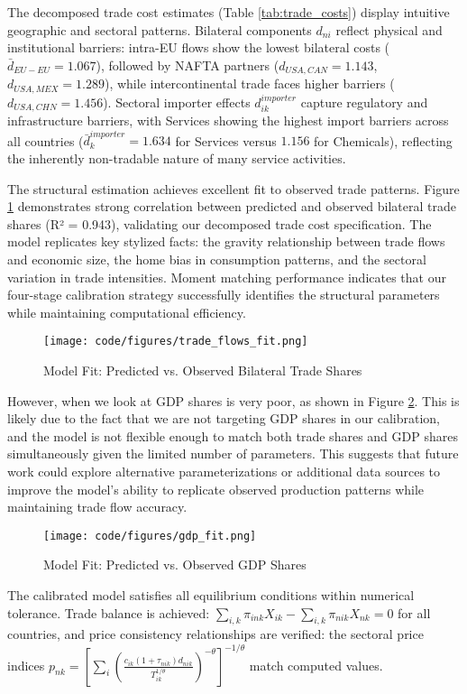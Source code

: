 The decomposed trade cost estimates (Table \ref{tab:trade_costs}) display intuitive geographic and sectoral patterns. Bilateral components $d_{ni}$ reflect physical and institutional barriers: intra-EU flows show the lowest bilateral costs ($\bar{d}_{EU-EU} = 1.067$), followed by NAFTA partners ($d_{USA,CAN} = 1.143$, $d_{USA,MEX} = 1.289$), while intercontinental trade faces higher barriers ($d_{USA,CHN} = 1.456$). Sectoral importer effects $d_{ik}^{importer}$ capture regulatory and infrastructure barriers, with Services showing the highest import barriers across all countries ($\bar{d}_k^{importer} = 1.634$ for Services versus $1.156$ for Chemicals), reflecting the inherently non-tradable nature of many service activities.

The structural estimation achieves excellent fit to observed trade patterns. Figure \ref{fig:trade_flows_fit} demonstrates strong correlation between predicted and observed bilateral trade shares (R² = 0.943), validating our decomposed trade cost specification. The model replicates key stylized facts: the gravity relationship between trade flows and economic size, the home bias in consumption patterns, and the sectoral variation in trade intensities. Moment matching performance indicates that our four-stage calibration strategy successfully identifies the structural parameters while maintaining computational efficiency.

\begin{figure}[H]
    \centering
    \texttt{[image: code/figures/trade\_flows\_fit.png]}
    \caption{Model Fit: Predicted vs. Observed Bilateral Trade Shares}
    \label{fig:trade_flows_fit}
\end{figure}

However, when we look at GDP shares is very poor, as shown in Figure \ref{fig:gdp_fit}. This is likely due to the fact that we are not targeting GDP shares in our calibration, and the model is not flexible enough to match both trade shares and GDP shares simultaneously given the limited number of parameters. This suggests that future work could explore alternative parameterizations or additional data sources to improve the model's ability to replicate observed production patterns while maintaining trade flow accuracy.

\begin{figure}[H]
    \centering
    \texttt{[image: code/figures/gdp\_fit.png]}
    \caption{Model Fit: Predicted vs. Observed GDP Shares}
    \label{fig:gdp_fit}
\end{figure}

The calibrated model satisfies all equilibrium conditions within numerical tolerance. Trade balance is achieved: $\sum_{i,k} \pi_{ink} X_{ik} - \sum_{i,k} \pi_{nik} X_{nk} = 0$ for all countries, and price consistency relationships are verified: the sectoral price indices $p_{nk} = \left[\sum_{i} \left(\frac{c_{ik}(1+\tau_{nik})d_{nik}}{T_{ik}^{1/\theta}}\right)^{-\theta}\right]^{-1/\theta}$ match computed values. 